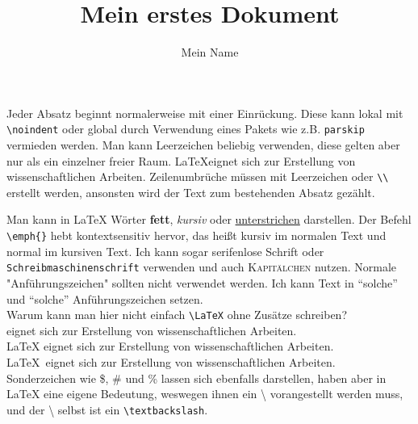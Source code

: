 \documentclass[11pt,a4paper]{article}
\title{Mein erstes Dokument}
\author{Mein Name}
\begin{document}
\maketitle %

Jeder Absatz beginnt normalerweise mit einer Einrückung. Diese kann lokal mit \verb|\noindent| oder global durch Verwendung eines Pakets wie z.B. \verb|parskip| vermieden werden.
Man kann Leerzeichen     beliebig     verwenden, diese gelten aber nur als ein einzelner freier Raum. \LaTeX     eignet sich zur Erstellung von wissenschaftlichen Arbeiten.
Zeilenumbrüche müssen mit Leerzeichen oder \verb|\\| erstellt werden, ansonsten wird der Text zum bestehenden Absatz gezählt.

Man kann in \LaTeX{} Wörter \textbf{fett}, \textit{kursiv} oder \underline{unterstrichen} darstellen.  Der Befehl \verb|\emph{}| hebt kontextsensitiv hervor, das heißt kursiv im normalen Text und normal im kursiven Text. Ich kann sogar \textsf{serifenlose Schrift} oder \texttt{Schreibmaschinenschrift} verwenden und auch \textsc{Kapitälchen} nutzen. Normale "Anführungszeichen" sollten nicht verwendet werden. Ich kann Text in "`solche"' und ``solche'' Anführungszeichen setzen.\\

\noindent Warum kann man hier nicht einfach \verb|\LaTeX| ohne Zusätze schreiben?\\

\noindent{\LaTeX } eignet sich zur Erstellung von wissenschaftlichen Arbeiten.\\
\noindent\LaTeX{} eignet sich zur Erstellung von wissenschaftlichen Arbeiten.\\
\noindent\LaTeX\ eignet sich zur Erstellung von wissenschaftlichen Arbeiten.\\

Sonderzeichen wie \$, \# und \% lassen sich ebenfalls darstellen, haben aber in \LaTeX{} eine eigene Bedeutung, weswegen ihnen ein \textbackslash{} vorangestellt werden muss, und der \textbackslash{} selbst ist ein \verb|\textbackslash|.
\end{document}
